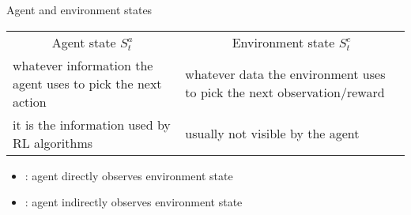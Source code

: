 \bgroup
{\renewcommand{\arraystretch}{2} 
\begin{frame}{Agent and environment states}
\centering
\begin{tabular}{l|l}
\multicolumn{1}{c|}{Agent state $S_t^a$}&
\multicolumn{1}{c}{Environment state $S_t^e$}\\
\multicolumn{1}{p{6cm}|}{whatever information the agent uses to pick the next action}&
\multicolumn{1}{p{6cm}}{whatever data the environment uses to pick the next observation/reward}\\
\multicolumn{1}{p{6cm}|}{it is the information used by RL algorithms}&
\multicolumn{1}{p{6cm}}{usually not visible by the agent}
\end{tabular}
\begin{itemize}
\item {}: agent directly observes environment state
\item {}: agent indirectly observes environment state
\end{itemize}
\end{frame}
\egroup